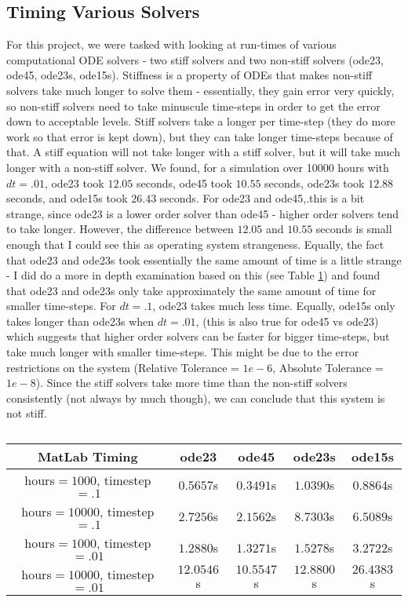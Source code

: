 \documentclass[]{article}
\begin{document}
		\subsection{Timing Various Solvers}
		For this project, we were tasked with looking at run-times of various computational ODE solvers - two stiff solvers and two non-stiff solvers (ode23, ode45, ode23s, ode15s). Stiffness is a property of ODEs that makes non-stiff solvers take much longer to solve them - essentially, they gain error very quickly, so non-stiff solvers need to take minuscule time-steps in order to get the error down to acceptable levels. Stiff solvers take a longer per time-step (they do more work so that error is kept down), but they can take longer time-steps because of that. A stiff equation will not take longer with a stiff solver, but it will take much longer with a non-stiff solver. We found, for a simulation over 10000 hours with $\textit{dt} = .01$, ode23 took $12.05$ seconds, ode45 took $10.55$ seconds, ode23s took $12.88$ seconds, and ode15s took $26.43$ seconds. For ode23 and ode45,.this is a bit strange, since ode23 is a lower order solver than ode45 - higher order solvers tend to take longer. However, the difference between $12.05$ and $10.55$ seconds is small enough that I could see this as operating system strangeness. Equally, the fact that ode23 and ode23s took essentially the same amount of time is a little strange - I did do a more in depth examination based on this (see Table \ref{tab:timing}) and found that ode23 and ode23s only take approximately the same amount of time for smaller time-steps. For $\textit{dt} = .1$, ode23 takes much less time. Equally, ode15s only takes longer than ode23s when $\textit{dt} = .01$, (this is also true for ode45 vs ode23) which suggests that higher order solvers can be faster for bigger time-steps, but take much longer with smaller time-steps. This might be due to the error restrictions on the system (Relative Tolerance = $ 1e-6 $, Absolute Tolerance = $ 1e-8 $). Since the stiff solvers take more time than the non-stiff solvers consistently (not always by much though), we can conclude that this system is not stiff.

		\begin{table}[h]
			\centering
			\begin{tabular}{|c|c|c|c|c|}
				\hline
				MatLab Timing & ode23 & ode45 & ode23s & ode15s \\ \hline
				hours$=1000$, timestep$=.1$ & $0.5657$s & $0.3491$s & $1.0390$s & $0.8864$s \\ \hline
				hours$=10000$, timestep$=.1$ & $2.7256$s & $2.1562$s & $8.7303$s & $6.5089$s \\ \hline
				hours$=1000$, timestep$=.01$ & $1.2880$s & $1.3271$s & $1.5278$s & $3.2722$s \\ \hline
				hours$=10000$, timestep$=.01$ & $12.0546$s & $10.5547$s & $12.8800$s & $26.4383$s \\ \hline
			\end{tabular}
			\caption{}
			\label{tab:timing}
		\end{table}
\end{document}
